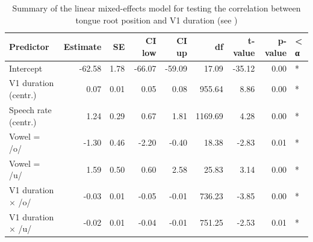 \documentclass[12pt,]{article}
\begin{document}
\begin{table}[t]

\caption{\label{tab:tra-lm-2-table}Summary of the linear mixed-effects model for testing the correlation between tongue root position and V1 duration  (see )}
\centering
\fontsize{8}{10}\selectfont
\begin{tabular}{lrrrrrrrl}
\toprule
Predictor & Estimate & SE & CI low & CI up & df & t-value & p-value & < α\\
\midrule
Intercept & -62.58 & 1.78 & -66.07 & -59.09 & 17.09 & -35.12 & 0.00 & *\\
V1 duration (centr.) & 0.07 & 0.01 & 0.05 & 0.08 & 955.64 & 8.86 & 0.00 & *\\
Speech rate (centr.) & 1.24 & 0.29 & 0.67 & 1.81 & 1169.69 & 4.28 & 0.00 & *\\
Vowel = /o/ & -1.30 & 0.46 & -2.20 & -0.40 & 18.38 & -2.83 & 0.01 & *\\
Vowel = /u/ & 1.59 & 0.50 & 0.60 & 2.58 & 25.83 & 3.14 & 0.00 & *\\
V1 duration × /o/ & -0.03 & 0.01 & -0.05 & -0.01 & 736.23 & -3.85 & 0.00 & *\\
V1 duration × /u/ & -0.02 & 0.01 & -0.04 & -0.01 & 751.25 & -2.53 & 0.01 & *\\
\bottomrule
\end{tabular}
\end{table}


\end{document}
